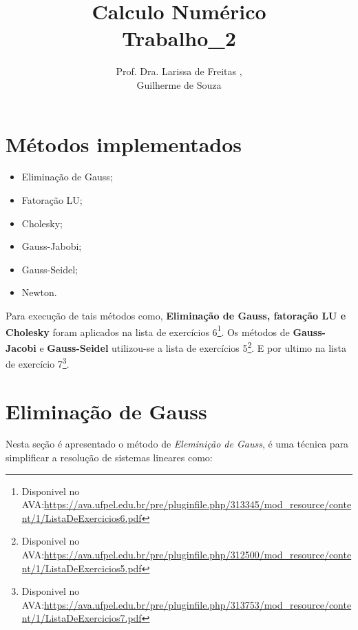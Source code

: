 \documentclass[12pt]{article}
\title{Calculo Numérico\\Trabalho\_2}
\author{Prof. Dra. Larissa de Freitas \inst{1},\\Guilherme de Souza\inst{1}}
\begin{document}
 

\maketitle
\br

\section{Métodos implementados}
\begin{itemize}
  \item Eliminação de Gauss;
  \item Fatoração LU;
  \item Cholesky;
  \item Gauss-Jabobi;
  \item Gauss-Seidel;
  \item Newton.
\end{itemize}

Para execução de tais métodos como, \textbf{Eliminação de Gauss, fatoração LU e Cholesky} foram aplicados na lista de exercícios 6\footnote{Disponivel no AVA:\url{https://ava.ufpel.edu.br/pre/pluginfile.php/313345/mod_resource/content/1/ListaDeExercicios6.pdf}}. Os métodos de \textbf{Gauss-Jacobi} e \textbf{Gauss-Seidel} utilizou-se a lista de exercícios 5\footnote{Disponivel no AVA:\url{https://ava.ufpel.edu.br/pre/pluginfile.php/312500/mod_resource/content/1/ListaDeExercicios5.pdf}}. E por ultimo na lista de exercício 7\footnote{Disponivel no AVA:\url{https://ava.ufpel.edu.br/pre/pluginfile.php/313753/mod_resource/content/1/ListaDeExercicios7.pdf}}.


\section{Eliminação de Gauss}

Nesta seção é apresentado o método de \textit{Eleminição de Gauss}, é uma técnica para simplificar a resolução de sistemas lineares como:
\end{document}
